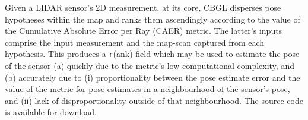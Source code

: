 Given a LIDAR sensor's 2D measurement, at its core, CBGL disperses pose
hypotheses within the map and ranks them ascendingly according to the value of
the Cumulative Absolute Error per Ray (CAER) metric. The latter's inputs
comprise the input measurement and the map-scan captured from each hypothesis.
This produces a \texttt{r}(ank)-field which may be used to estimate the pose of
the sensor (a) quickly due to the metric's low computational complexity, and
(b) accurately due to (i) proportionality between the pose estimate error and
the value of the metric for pose estimates in a neighbourhood of the sensor's
pose, and (ii) lack of disproportionality outside of that neighbourhood.  The
source code is available for download.
